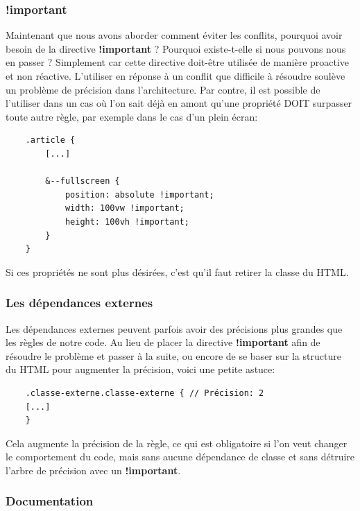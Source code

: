 \documentclass[12pt, a4paper]{report}
\begin{document}
\subsubsection{!important}

Maintenant que nous avons aborder comment éviter les conflits, pourquoi avoir besoin de la directive \textbf{!important} ? Pourquoi existe-t-elle si nous pouvons nous en passer ?
Simplement car cette directive doit-être utilisée de manière proactive et non réactive.
L'utiliser en réponse à un conflit que difficile à résoudre soulève un problème de précision dans l'architecture.
Par contre, il est possible de l'utiliser dans un cas où l'on sait déjà en amont qu'une propriété DOIT surpasser toute autre règle, par exemple dans le cas d'un plein écran:

\begin{lstlisting}
    .article {
        [...]

        &--fullscreen {
            position: absolute !important;
            width: 100vw !important;
            height: 100vh !important;
        }
    }
\end{lstlisting}

Si ces propriétés ne sont plus désirées, c'est qu'il faut retirer la classe du HTML.

\subsubsection{Les dépendances externes}

Les dépendances externes peuvent parfois avoir des précisions plus grandes que les règles de notre code.
Au lieu de placer la directive \textbf{!important} afin de résoudre le problème et passer à la suite, ou encore de se baser sur la structure du HTML pour augmenter la précision, voici une petite astuce:

\begin{lstlisting}
    .classe-externe.classe-externe { // Précision: 2
    [...]
    }
\end{lstlisting}

Cela augmente la précision de la règle, ce qui est obligatoire si l'on veut changer le comportement du code, mais sans aucune dépendance de classe et sans détruire l'arbre de précision avec un \textbf{!important}.

\subsubsection{Documentation}
\end{document}
